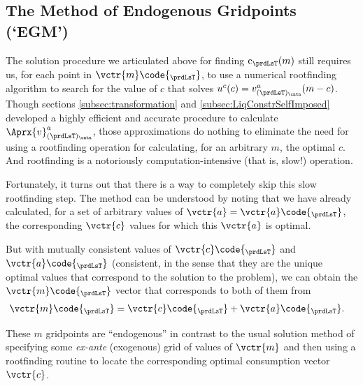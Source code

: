 \documentclass[titlepage, headings=optiontotocandhead]{econtex}
\begin{document}
\hypertarget{the-method-of-endogenous-gridpoints}{}
\subsection{The Method of Endogenous Gridpoints (`EGM')}\label{subsec:egm}

The solution procedure we articulated above for finding $\mathrm{c}_{\prdLsT}(m)$ still requires us, for each point in $\vctr{m}\code{_{\prdLsT}}$, to use a numerical rootfinding algorithm to search for the value of $c$ that solves $u^{c}(c) = v^{a}_{(\prdLsT)_\cntn}(m-c)$.  Though sections \ref{subsec:transformation} and \ref{subsec:LiqConstrSelfImposed} developed a highly efficient and accurate procedure to calculate $\Aprx{v}^{a}_{(\prdLsT)_\cntn}$, those approximations do nothing to eliminate the need for using a rootfinding operation for calculating, for an arbitrary $m$, the optimal $c$.  And rootfinding is a notoriously computation-intensive (that is, slow!) operation.

Fortunately, it turns out that there is a way to completely skip this slow rootfinding step.  The method can be understood by noting that we have already calculated, for a set of arbitrary values of $\vctr{a}=\vctr{a}\code{_{\prdLsT}}$, the corresponding $\vctr{c}$ values for which this $\vctr{a}$ is optimal.


But with mutually consistent values of $\vctr{c}\code{_{\prdLsT}}$ and $\vctr{a}\code{_{\prdLsT}}$ (consistent, in the sense that they are the unique optimal values that correspond to the solution to the problem), we can obtain the $\vctr{m}\code{_{\prdLsT}}$ vector that corresponds to both of them from
\begin{equation}\begin{gathered}\begin{aligned}
      \vctr{m}\code{_{\prdLsT}}  & = {\vctr{c}\code{_{\prdLsT}}+\vctr{a}\code{_{\prdLsT}}}.
    \end{aligned}\end{gathered}\end{equation}


These $m$ gridpoints are ``endogenous'' in contrast to the usual solution method of specifying some \textit{ex-ante} (exogenous) grid of values of $\vctr{m}$ and then using a rootfinding routine to locate the corresponding optimal consumption vector $\vctr{c}$.
\end{document}
